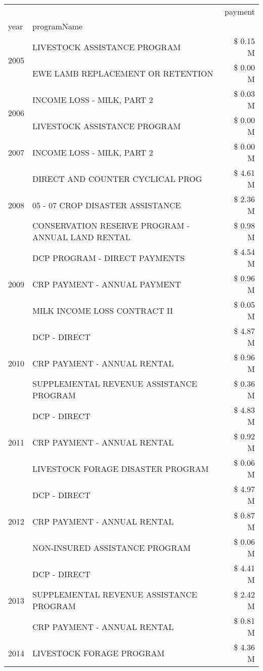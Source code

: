 \begin{tabular}{llr}
\toprule
 &  & payment \\
year & programName &  \\
\midrule
\multirow[t]{2}{*}{2005} & LIVESTOCK ASSISTANCE PROGRAM & \$ 0.15 M \\
 & EWE LAMB REPLACEMENT OR RETENTION & \$ 0.00 M \\
\cline{1-3}
\multirow[t]{2}{*}{2006} & INCOME LOSS - MILK, PART 2 & \$ 0.03 M \\
 & LIVESTOCK ASSISTANCE PROGRAM & \$ 0.00 M \\
\cline{1-3}
2007 & INCOME LOSS - MILK, PART 2 & \$ 0.00 M \\
\cline{1-3}
\multirow[t]{3}{*}{2008} & DIRECT AND COUNTER CYCLICAL PROG & \$ 4.61 M \\
 & 05 - 07 CROP DISASTER ASSISTANCE & \$ 2.36 M \\
 & CONSERVATION RESERVE PROGRAM - ANNUAL LAND RENTAL & \$ 0.98 M \\
\cline{1-3}
\multirow[t]{3}{*}{2009} & DCP PROGRAM - DIRECT PAYMENTS & \$ 4.54 M \\
 & CRP PAYMENT - ANNUAL PAYMENT & \$ 0.96 M \\
 & MILK INCOME LOSS CONTRACT II & \$ 0.05 M \\
\cline{1-3}
\multirow[t]{3}{*}{2010} & DCP - DIRECT & \$ 4.87 M \\
 & CRP PAYMENT - ANNUAL RENTAL & \$ 0.96 M \\
 & SUPPLEMENTAL REVENUE ASSISTANCE PROGRAM & \$ 0.36 M \\
\cline{1-3}
\multirow[t]{3}{*}{2011} & DCP - DIRECT & \$ 4.83 M \\
 & CRP PAYMENT - ANNUAL RENTAL & \$ 0.92 M \\
 & LIVESTOCK FORAGE DISASTER PROGRAM & \$ 0.06 M \\
\cline{1-3}
\multirow[t]{3}{*}{2012} & DCP - DIRECT & \$ 4.97 M \\
 & CRP PAYMENT - ANNUAL RENTAL & \$ 0.87 M \\
 & NON-INSURED ASSISTANCE PROGRAM & \$ 0.06 M \\
\cline{1-3}
\multirow[t]{3}{*}{2013} & DCP - DIRECT & \$ 4.41 M \\
 & SUPPLEMENTAL REVENUE ASSISTANCE PROGRAM & \$ 2.42 M \\
 & CRP PAYMENT - ANNUAL RENTAL & \$ 0.81 M \\
\cline{1-3}
\multirow[t]{3}{*}{2014} & LIVESTOCK FORAGE PROGRAM & \$ 4.36 M \\

\end{tabular}
